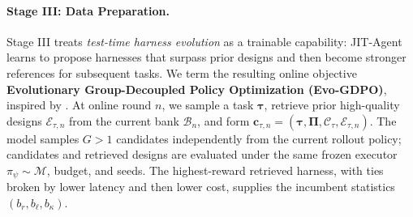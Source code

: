 \documentclass{article}
\newcommand{\ourmethod}{JIT-Agent\xspace}
\begin{document}
\paragraph{Stage III: Data Preparation.}\label{sec:harness_evolution}
Stage III treats \emph{test-time harness evolution} as a trainable capability: \ourmethod learns to propose harnesses that surpass prior designs and then become stronger references for subsequent tasks. We term the resulting online objective \textbf{Evolutionary Group-Decoupled Policy Optimization (Evo-GDPO)}, inspired by \citep{liu2026gdpogrouprewarddecouplednormalization}.
At online round $n$, we sample a task $\boldsymbol{\tau}$, retrieve prior high-quality designs $\mathcal{E}_{\tau,n}$ from the current bank $\mathcal{B}_n$, and form $\mathbf{c}_{\tau,n}=(\boldsymbol{\tau},\boldsymbol{\Pi},\mathcal{C}_{\tau},\mathcal{E}_{\tau,n})$. The model samples $G>1$ candidates independently from the current rollout policy; candidates and retrieved designs are evaluated under the same frozen executor $\pi_{\psi}\sim\mathcal{M}$, budget, and seeds. The highest-reward retrieved harness, with ties broken by lower latency and then lower cost, supplies the incumbent statistics $(b_r,b_{\ell},b_{\kappa})$.

\vspace{-0.5em}
\end{document}
